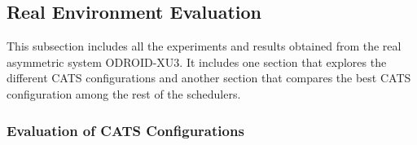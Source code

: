 \subsection{Real Environment Evaluation}
This subsection includes all the experiments and results obtained from the real asymmetric system ODROID-XU3.
It includes one section that explores the different CATS configurations and another section that compares the best CATS configuration among the rest of the schedulers.

\subsubsection{Evaluation of CATS Configurations}
\label{sec.cats_eval}
\begin{figure}[!t]
	\centering
	\\
\end{figure}
